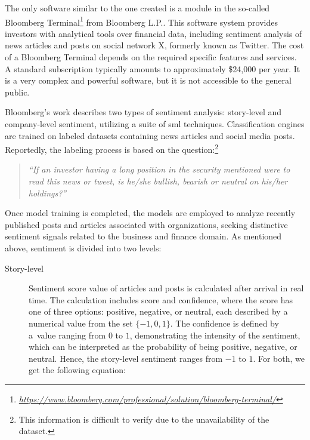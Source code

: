 The only software similar to the one created is a module in the so-called Bloomberg Terminal\footnote{\href{https://www.bloomberg.com/professional/solution/bloomberg-terminal/}{\textit{https://www.bloomberg.com/professional/solution/bloomberg-terminal/}}} from Bloomberg L.P.. This software system provides investors with analytical tools over financial data, including sentiment analysis of news articles and posts on social network X, formerly known as Twitter. The cost of a Bloomberg Terminal depends on the required specific features and services. \linebreak A standard subscription typically amounts to approximately \$24,000 per year. It is a very complex and powerful software, but it is not accessible to the general public.

Bloomberg's work \parencite{bloomberg} describes two types of sentiment analysis: story-level and company-level sentiment, utilizing a suite of \acrshort{sml} techniques. Classification engines are trained on labeled datasets containing news articles and social media posts. Reportedly, the labeling process is based on the question:\footnote{This information is difficult to verify due to the unavailability of the dataset.} \begin{quote}
    \textit{``If an investor having a long position in the security mentioned were to read this news or tweet, is he/she bullish, bearish or neutral on his/her holdings?''}
\end{quote} Once model training is completed, the models are employed to analyze recently published posts and articles associated with organizations, seeking distinctive sentiment signals related to the business and finance domain. As mentioned above, sentiment is divided into two levels:\begin{description}
    \item[Story-level] Sentiment score value of articles and posts is calculated after arrival in real time. The calculation includes score and confidence, where the score has one of three options: positive, negative, or neutral, each described by a numerical value from the set $\{-1, 0, 1\}$. The confidence is defined by a~value ranging from $0$ to $1$, demonstrating the intensity of the sentiment, which can be interpreted as the probability of being positive, negative, or neutral. Hence, the story-level sentiment ranges from $-1$ to $1$. For both, we get the following equation:

\end{description}

